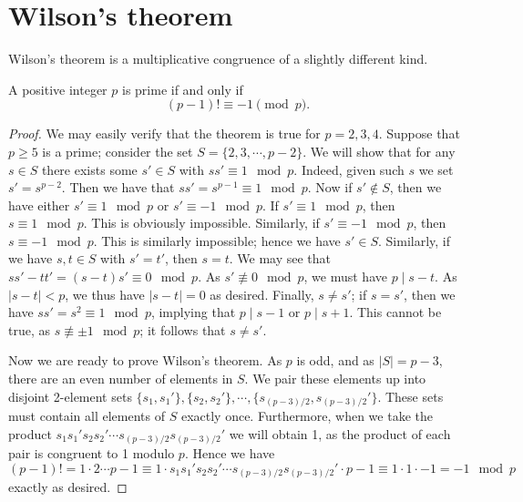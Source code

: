 \section{Wilson's theorem}
\label{sec:wilson}
Wilson's theorem is a multiplicative congruence of a slightly different kind.

\begin{thm}
A positive integer $p$ is prime if and only if $$(p-1)!\equiv -1 \pmod{p}.$$
\begin{proof}
We may easily verify that the theorem is true for $p = 2, 3, 4$.  Suppose that $p \ge 5$ is a prime; consider the set $S = \{2,3,\cdots, p-2\}$.  We will show that for any $s \in S$ there exists some $s' \in S$ with $ss' \equiv 1\mod{p}$.  Indeed, given such $s$ we set $s' = s^{p-2}$.  Then we have that $ss' = s^{p-1}\equiv1\mod{p}$.  Now if $s' \notin S$, then we have either $s' \equiv 1\mod{p}$ or $s' \equiv -1\mod{p}$.  If $s' \equiv1\mod{p}$, then $s \equiv 1\mod{p}$.  This is obviously impossible.  Similarly, if $s' \equiv -1\mod{p}$, then $s \equiv -1\mod{p}$.  This is similarly impossible; hence we have $s' \in S$.  Similarly, if we have $s, t \in S$ with $s' = t'$, then $s = t$.  We may see that $ss' - tt' = (s-t)s' \equiv 0\mod{p}$.  As $s' \not\equiv0\mod{p}$, we must have $p \mid s-t$.  As $|s - t| < p$, we thus have $|s - t| = 0$ as desired.  Finally, $s \neq s'$; if $s = s'$, then we have $ss' = s^2 \equiv 1\mod{p}$, implying that $p \mid s-1$ or $p \mid s+1$.  This cannot be true, as $s \not\equiv \pm1\mod{p}$; it follows that $s \neq s'$.

Now we are ready to prove Wilson's theorem.  As $p$ is odd, and as $|S| = p-3$, there are an even number of elements in $S$.  We pair these elements up into disjoint 2-element sets $\{s_1, s_1'\}, \{s_2, s_2'\}, \cdots, \{s_{(p-3)/2},s_{(p-3)/2}'\}$.  These sets must contain all elements of $S$ exactly once.  Furthermore, when we take the product $s_1s_1's_2s_2'\cdots s_{(p-3)/2}s_{(p-3)/2}'$ we will obtain 1, as the product of each pair is congruent to 1 modulo $p$.  Hence we have $$(p-1)! = 1\cdot2\cdots p-1 \equiv 1\cdot s_1s_1's_2s_2'\cdots s_{(p-3)/2}s_{(p-3)/2}'\cdot p-1 \equiv 1\cdot1\cdot-1 = -1\mod{p}$$ exactly as desired.
\end{proof}
\end{thm}
